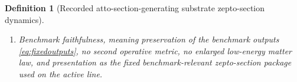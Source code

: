 \documentclass[11pt]{article}
\newcommand{\AttoSectionShell}[1]{\mathcal Z_{#1}^{\mathrm{attosec}}}
\newcommand{\ZeptoSectionProj}[1]{\Pi_{#1}^{\mathrm{zeptosec}}}
\newcommand{\ZeptoSectionFiber}[2]{\mathcal F_{#1}^{\mathrm{zeptosec}}(#2)}
\newcommand{\ZeptoSectionFunctional}[1]{\mathscr U_{#1}^{\mathrm{zeptosec}}}
\newcommand{\ZeptoSectionShell}[1]{\mathcal Z_{#1}^{\mathrm{zeptosec}}}
\newtheorem{definition}{Definition}
\begin{document}
\begin{definition}[Recorded atto-section-generating substrate zepto-section dynamics]
\begin{enumerate}
\[\begin{array}{l}
    \ZeptoSectionFunctional{\sigma}(q)
    =
    \displaystyle\min_{r\in\ZeptoSectionFiber{\sigma}{\ZeptoSectionProj{\sigma}(q)}}
    \ZeptoSectionFunctional{\sigma}(r)
    \end{array}
    \right\},
    \]
    and
    \[
    \ZeptoSectionProj{\sigma}\big|_{\ZeptoSectionShell{\sigma}}
    :
    \ZeptoSectionShell{\sigma}\xrightarrow{\cong}\AttoSectionShell{\sigma}
    \]
    is a diffeomorphism.
    \item Benchmark faithfulness, meaning preservation of the benchmark outputs \eqref{eq:fixedoutputs}, no second operative metric, no enlarged low-energy matter law, and presentation as the fixed benchmark-relevant zepto-section package used on the active line.
\end{enumerate}
\end{definition}
\end{document}
